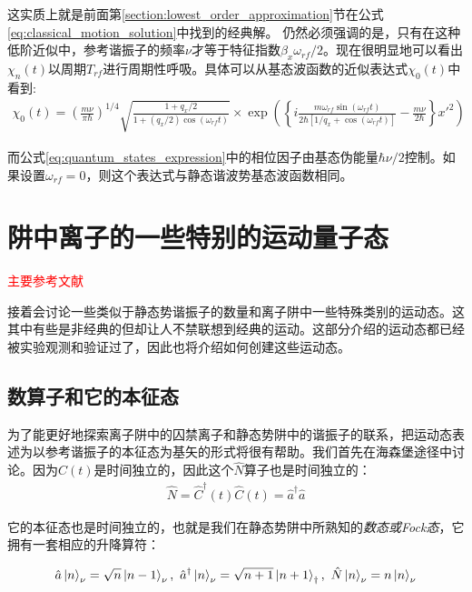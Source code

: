 这实质上就是前面第\ref{section:lowest_order_approximation}节在公式\eqref{eq:classical_motion_solution}中找到的经典解。
仍然必须强调的是，只有在这种低阶近似中，参考谐振子的频率$\nu$才等于特征指数$\beta_x\omega_{rf}/2$。现在很明显地可以看出$\chi_n(t)$以周期$T_{rf}$进行周期性呼吸。具体可以从基态波函数的近似表达式$\chi_0(t)$中看到:
\begin{align}
    \chi_0(t)=\left(\frac{m\nu}{\pi \hbar}\right)^{1/4}\sqrt{\frac{1+q_x/2}{1+(q_x/2)\cos(\omega_{rf}t)}}
    \times \exp\left(\left\{i\frac{m\omega_{rf}\sin(\omega_{rf}t)}{2\hbar\left[1/q_x+\cos(\omega_{rf}t)\right]}-\frac{m\nu}{2\hbar}\right\}x'^2\right)
\end{align}

而公式\eqref{eq:quantum_states_expression}中的相位因子由基态伪能量$\hbar\nu/2$控制。如果设置$\omega_{rf}=0$，则这个表达式与静态谐波势基态波函数相同。




\section[阱中离子的一些特别的运动量子态]{阱中离子的一些特别的运动量子态}
\textcolor{red}{主要参考文献\cite[chap2-C]{Leibfried_Blatt_Monroe_Wineland_2003}}

接着会讨论一些类似于静态势谐振子的数量和离子阱中一些特殊类别的运动态。这其中有些是非经典的但却让人不禁联想到经典的运动。这部分介绍的运动态都已经被实验观测和验证过了，因此也将介绍如何创建这些运动态。


\subsection[数算子和它的本征态]{数算子和它的本征态}

为了能更好地探索离子阱中的囚禁离子和静态势阱中的谐振子的联系，把运动态表述为以参考谐振子的本征态为基矢的形式将很有帮助。我们首先在海森堡途径中讨论。因为$\hat{C}(t)$是时间独立的，因此这个$\hat{N}$算子也是时间独立的：
\begin{align}
    \hat{N}=\hat{C}^\dagger(t)\hat{C}(t)=\hat{a}^\dagger\hat{a}
\end{align}

它的本征态也是时间独立的，也就是我们在静态势阱中所熟知的\emph{数态或Fock态}，它拥有一套相应的升降算符：

\begin{align}
    \hat{a}\ket{n}_\nu=\sqrt{n}\ket{n-1}_\nu,\ \hat{a}^\dagger\ket{n}_\nu=\sqrt{n+1}\ket{n+1}_\dagger,\ \hat{N}\ket{n}_\nu=n\ket{n}_\nu
\end{align}

